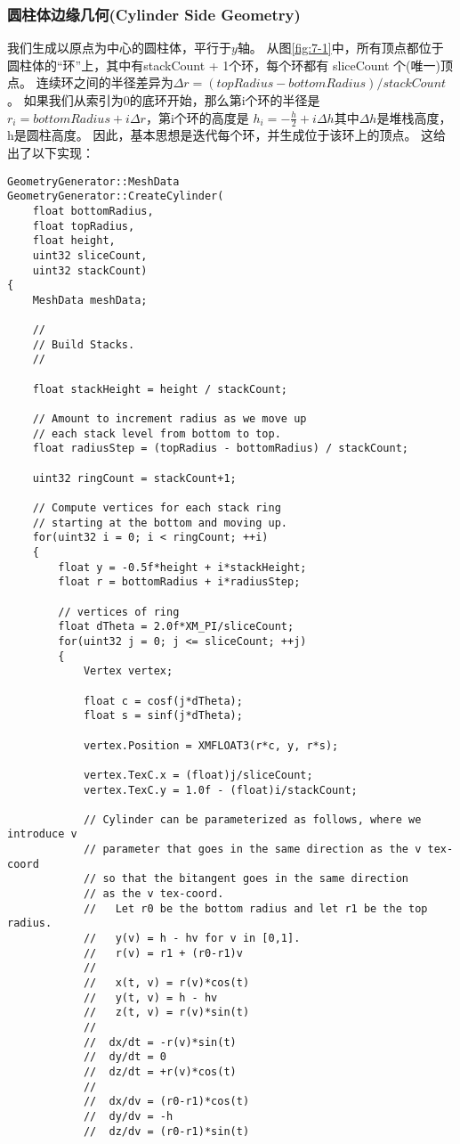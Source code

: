 \subsubsection{圆柱体边缘几何(Cylinder Side Geometry)}
\begin{flushleft}
我们生成以原点为中心的圆柱体，平行于$y$轴。 从图\ref{fig:7-1}中，所有顶点都位于圆柱体的“环”上，其中有stackCount + 1个环，每个环都有 sliceCount 个(唯一)顶点。 连续环之间的半径差异为$\Delta r=(topRadius - bottomRadius)/ stackCount$。 如果我们从索引为0的底环开始，那么第i个环的半径是$r_{i} = bottomRadius + i\Delta r$，第i个环的高度是 $h_{i}=-\frac{h}{2}+i\Delta h$其中$\Delta h$是堆栈高度，h是圆柱高度。 因此，基本思想是迭代每个环，并生成位于该环上的顶点。 这给出了以下实现：\\
\end{flushleft}
\begin{lstlisting}
GeometryGenerator::MeshData 
GeometryGenerator::CreateCylinder(
    float bottomRadius, 
    float topRadius, 
    float height, 
    uint32 sliceCount, 
    uint32 stackCount)
{
    MeshData meshData;

    //
    // Build Stacks.
    // 

    float stackHeight = height / stackCount;

    // Amount to increment radius as we move up 
    // each stack level from bottom to top.
    float radiusStep = (topRadius - bottomRadius) / stackCount;

    uint32 ringCount = stackCount+1;

    // Compute vertices for each stack ring 
    // starting at the bottom and moving up.
    for(uint32 i = 0; i < ringCount; ++i)
    {
        float y = -0.5f*height + i*stackHeight;
        float r = bottomRadius + i*radiusStep;

        // vertices of ring
        float dTheta = 2.0f*XM_PI/sliceCount;
        for(uint32 j = 0; j <= sliceCount; ++j)
        {
            Vertex vertex;

            float c = cosf(j*dTheta);
            float s = sinf(j*dTheta);

            vertex.Position = XMFLOAT3(r*c, y, r*s);

            vertex.TexC.x = (float)j/sliceCount;
            vertex.TexC.y = 1.0f - (float)i/stackCount;

            // Cylinder can be parameterized as follows, where we introduce v
            // parameter that goes in the same direction as the v tex-coord
            // so that the bitangent goes in the same direction 
            // as the v tex-coord.
            //   Let r0 be the bottom radius and let r1 be the top radius.
            //   y(v) = h - hv for v in [0,1].
            //   r(v) = r1 + (r0-r1)v
            //
            //   x(t, v) = r(v)*cos(t)
            //   y(t, v) = h - hv
            //   z(t, v) = r(v)*sin(t)
            // 
            //  dx/dt = -r(v)*sin(t)
            //  dy/dt = 0
            //  dz/dt = +r(v)*cos(t)
            //
            //  dx/dv = (r0-r1)*cos(t)
            //  dy/dv = -h
            //  dz/dv = (r0-r1)*sin(t)


\end{lstlisting}
